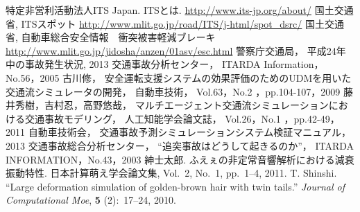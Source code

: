 \documentclass[14pt,a4j]{jsarticle}
\begin{document}
%
%
\begin{thebibliography}{9}
        特定非営利活動法人ITS Japan.
        ITSとは.
         \url{http://www.its-jp.org/about/} %
 	国土交通省,
	ITSスポット
 	\url{http://www.mlit.go.jp/road/ITS/j-html/spot_dsrc/}
 	国土交通省,
	自動車総合安全情報　衝突被害軽減ブレーキ
	\url{http://www.mlit.go.jp/jidosha/anzen/01asv/esc.html}
 	警察庁交通局，
	平成24年中の事故発生状況,
	 2013
	 交通事故分析センター，
	 ITARDA Information，
	 No.56，2005
	 古川修，
	 安全運転支援システムの効果評価のためのUDMを用いた交通流シミュレータの開発，
	 自動車技術，
	 Vol.63，No.2 ，pp.104-107，2009
	 藤井秀樹，吉村忍，高野悠哉，
	 マルチエージェント交通流シミュレーションにおける交通事故モデリング，
	 人工知能学会論文誌，
	  Vol.26，No.1 ，pp.42-49，2011
	自動車技術会，
	交通事故予測シミュレーションシステム検証マニュアル，
	2013
	交通事故総合分析センター，
	“追突事故はどうして起きるのか”，
	ITARDA INFORMATION，No.43，2003
         紳士太郎.
         ふえぇの非定常音響解析における減衰振動特性.
         日本計算萌え学会論文集,
         Vol.~2, No.~1, pp.~1--4, 2011.
         T. Shinshi. %
         ``Large deformation simulation of golden-brown hair with twin tails.''
         \textit{Journal of Computational Moe}, %
         \textbf{5} (2):~17--24, 2010. %
\end{thebibliography}
%
%
\end{document}
